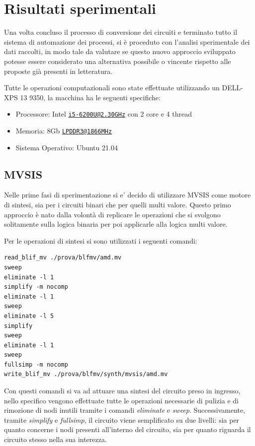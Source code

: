 \documentclass[]{book}
\providecommand{\tightlist}{%
  \setlength{\itemsep}{0pt}\setlength{\parskip}{0pt}}
\begin{document}
\hypertarget{risultati-sperimentali}{%
\chapter{Risultati sperimentali}\label{risultati-sperimentali}}

Una volta concluso il processo di conversione dei circuiti e terminato tutto il sistema di automazione dei processi, si è proceduto con l'analisi sperimentale dei dati raccolti, in modo tale da valutare se questo nuovo approccio sviluppato potesse essere considerato una alternativa possibile o vincente rispetto alle proposte già presenti in letteratura.

Tutte le operazioni computazionali sono state effettuate utilizzando un DELL-XPS 13 9350, la macchina ha le seguenti specifiche:

\begin{itemize}
\tightlist
\item
  Processore: Intel \href{mailto:i5-6200U@2.30GHz}{\nolinkurl{i5-6200U@2.30GHz}} con 2 core e 4 thread
\item
  Memoria: 8Gb \href{mailto:LPDDR3@1866MHz}{\nolinkurl{LPDDR3@1866MHz}}
\item
  Sistema Operativo: Ubuntu 21.04
\end{itemize}

\newpage

\hypertarget{mvsis-2}{%
\section{MVSIS}\label{mvsis-2}}

Nelle prime fasi di sperimentazione si e' decido di utilizzare MVSIS come motore di sintesi, sia per i circuiti binari che per quelli multi valore. Questo primo approccio è nato dalla volontà di replicare le operazioni che si svolgono solitamente sulla logica binaria per poi applicarle alla logica multi valore.

Per le operazioni di sintesi si sono utilizzati i seguenti comandi:

\begin{verbatim}
read_blif_mv ./prova/blfmv/amd.mv
sweep
eliminate -l 1
simplify -m nocomp
eliminate -l 1
sweep
eliminate -l 5
simplify
sweep
eliminate -l 1
sweep
fullsimp -m nocomp
write_blif_mv ./prova/blfmv/synth/mvsis/amd.mv
\end{verbatim}

Con questi comandi si va ad attuare una sintesi del circuito preso in ingresso, nello specifico vengono effettuate tutte le operazioni necessarie di pulizia e di rimozione di nodi inutili tramite i comandi \emph{eliminate} e \emph{sweep}. Successivamente, tramite \emph{simplify} e \emph{fullsimp}, il circuito viene semplificato su due livelli: sia per quanto concerne i nodi presenti all'interno del circuito, sia per quanto riguarda il circuito stesso nella sua interezza.
\end{document}
